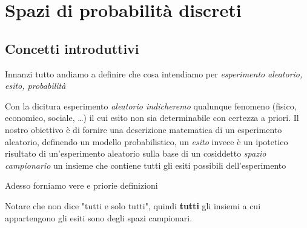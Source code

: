 % 

\chapter{Spazi di probabilità discreti}
\section{Concetti introduttivi}
Innanzi tutto andiamo a definire che cosa intendiamo per \textit{esperimento aleatorio, esito, probabilità}

Con la dicitura esperimento \textit{aleatorio indicheremo} qualunque fenomeno (fisico, economico, sociale, \dots ) il cui esito non sia determinabile con certezza a priori. Il nostro obiettivo è di fornire una descrizione matematica di un esperimento aleatorio, definendo un modello probabilistico, un \textit{esito} invece è un ipotetico risultato di un'esperimento aleatorio sulla base di un cosiddetto \textit{spazio campionario} un insieme che contiene tutti gli esiti possibili dell’esperimento



Adesso forniamo vere e priorie definizioni


Notare che non dice "tutti e solo tutti", quindi \textbf{tutti} gli insiemi a cui appartengono gli esiti sono degli spazi campionari.


